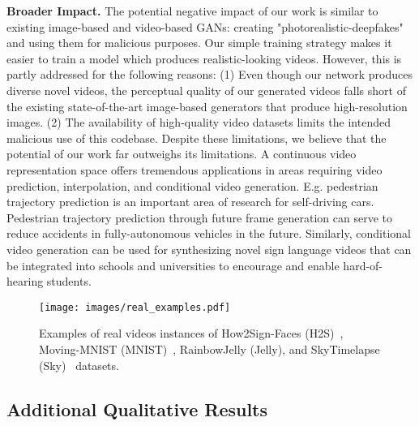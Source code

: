 \documentclass[10pt]{article} \usepackage[accepted]{tmlr}
\begin{document}
\textbf{Broader Impact. }
\label{broader_impact}
The potential negative impact of our work is similar to existing image-based and video-based GANs: creating "photorealistic-deepfakes" and using them for malicious purposes. Our simple training strategy makes it easier to train a model which produces realistic-looking videos. However, this is partly addressed for the following reasons: (1) Even though our network produces diverse novel videos, the perceptual quality of our generated videos falls short of the existing state-of-the-art image-based generators that produce high-resolution images. (2) The availability of high-quality video datasets limits the intended malicious use of this codebase. 
Despite these limitations, we believe that the potential of our work far outweighs its limitations. A continuous video representation space offers tremendous applications in areas requiring video prediction, interpolation, and conditional video generation. E.g. pedestrian trajectory prediction is an important area of research for self-driving cars. Pedestrian trajectory prediction through future frame generation can serve to reduce accidents in fully-autonomous vehicles in the future. Similarly, conditional video generation can be used for synthesizing novel sign language videos that can be integrated into schools and universities to encourage and enable hard-of-hearing students.


\begin{figure}[t]
  \centering
  \texttt{[image: images/real\_examples.pdf]}
  \caption{Examples of real videos instances of How2Sign-Faces (H2S)~\cite{how2sign}, Moving-MNIST (MNIST)~\cite{moving-mnist}, RainbowJelly (Jelly), and SkyTimelapse (Sky)~\cite{skytimelapse} datasets.}
  \label{fig:realexamples}
\end{figure}

\subsection{Additional Qualitative Results}
\end{document}
